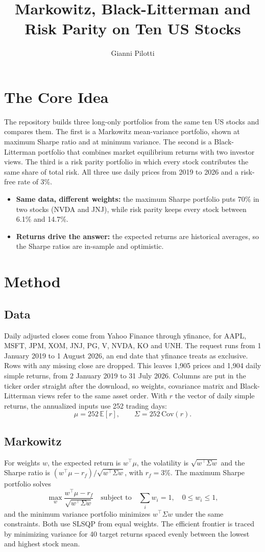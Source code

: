 \documentclass[11pt,a4paper]{article}
\title{Markowitz, Black-Litterman and Risk Parity on Ten US Stocks}
\author{Gianni Pilotti}
\date{}
\begin{document}
\maketitle

\section{The Core Idea}
The repository builds three long-only portfolios from the same ten US stocks and compares them. The first is a Markowitz mean-variance portfolio, shown at maximum Sharpe ratio and at minimum variance. The second is a Black-Litterman portfolio that combines market equilibrium returns with two investor views. The third is a risk parity portfolio in which every stock contributes the same share of total risk. All three use daily prices from 2019 to 2026 and a risk-free rate of 3\%.

\begin{itemize}
\item \textbf{Same data, different weights:} the maximum Sharpe portfolio puts 70\% in two stocks (NVDA and JNJ), while risk parity keeps every stock between 6.1\% and 14.7\%.
\item \textbf{Returns drive the answer:} the expected returns are historical averages, so the Sharpe ratios are in-sample and optimistic.
\end{itemize}

\section{Method}
\subsection{Data}
Daily adjusted closes come from Yahoo Finance through yfinance, for AAPL, MSFT, JPM, XOM, JNJ, PG, V, NVDA, KO and UNH. The request runs from 1 January 2019 to 1 August 2026, an end date that yfinance treats as exclusive. Rows with any missing close are dropped. This leaves 1,905 prices and 1,904 daily simple returns, from 2 January 2019 to 31 July 2026. Columns are put in the ticker order straight after the download, so weights, covariance matrix and Black-Litterman views refer to the same asset order. With $r$ the vector of daily simple returns, the annualized inputs use 252 trading days:
\[
\mu = 252\,\mathbb{E}[r], \qquad \Sigma = 252\,\mathrm{Cov}(r).
\]

\subsection{Markowitz}
For weights $w$, the expected return is $w^\top\mu$, the volatility is $\sqrt{w^\top\Sigma w}$ and the Sharpe ratio is $(w^\top\mu-r_f)/\sqrt{w^\top\Sigma w}$, with $r_f=3\%$. The maximum Sharpe portfolio solves
\[
\max_w \frac{w^\top\mu-r_f}{\sqrt{w^\top\Sigma w}}
\quad\text{subject to}\quad \sum_i w_i=1,\quad 0\le w_i\le 1,
\]
and the minimum variance portfolio minimizes $w^\top\Sigma w$ under the same constraints. Both use SLSQP from equal weights. The efficient frontier is traced by minimizing variance for 40 target returns spaced evenly between the lowest and highest stock mean.
\end{document}
